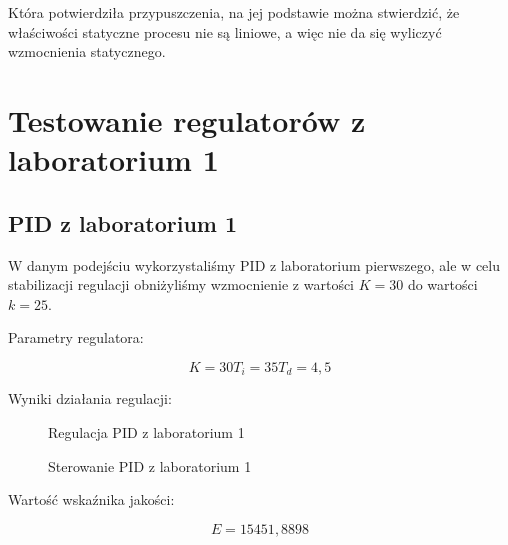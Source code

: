 Która potwierdziła przypuszczenia, na jej podstawie można stwierdzić, że właściwości statyczne procesu nie są liniowe, a więc nie da się wyliczyć wzmocnienia statycznego.

\section{Testowanie regulatorów z laboratorium 1}

\subsection{PID z laboratorium 1}

W danym podejściu wykorzystaliśmy PID z laboratorium pierwszego, ale w celu stabilizacji regulacji obniżyliśmy wzmocnienie z wartości $K = 30$ do wartości $k = 25$.

Parametry regulatora:

\begin{equation}
K = 30
T_i = 35
T_d = 4,5
\end{equation}

Wyniki działania regulacji:

\begin{figure}[H]
\centering

\caption{Regulacja PID z laboratorium 1}
\end{figure}

\begin{figure}[H]
\centering

\caption{Sterowanie PID z laboratorium 1}
\end{figure}

Wartość wskaźnika jakości:

\begin{equation}
E = 15451,8898
\end{equation}
